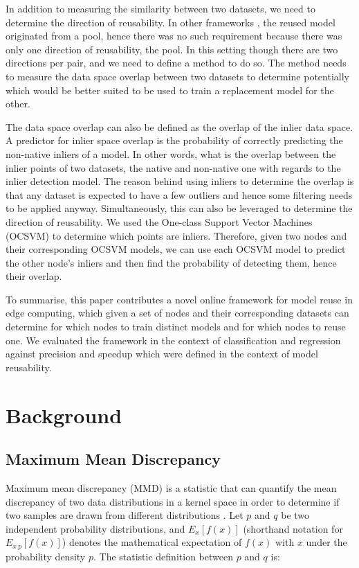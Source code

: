 \documentclass{mpaper}
\begin{document}
In addition to measuring the similarity between two datasets, we need to determine the direction of reusability. In other frameworks \cite{MaterializationReuse, KernelMMD}, the reused model originated from a pool, hence there was no such requirement because there was only one direction of reusability, the pool. In this setting though there are two directions per pair, and we need to define a method to do so. The method needs to measure the data space overlap between two datasets to determine potentially which would be better suited to be used to train a replacement model for the other. 

The data space overlap can also be defined as the overlap of the inlier data space. A predictor for inlier space overlap is the probability of correctly predicting the non-native inliers of a model. In other words, what is the overlap between the inlier points of two datasets, the native and non-native one with regards to the inlier detection model. The reason behind using inliers to determine the overlap is that any dataset is expected to have a few outliers and hence some filtering needs to be applied anyway. Simultaneously, this can also be leveraged to determine the direction of reusability. We used the One-class Support Vector Machines (OCSVM) \cite{OriginalOCSVM} to determine which points are inliers. Therefore, given two nodes and their corresponding OCSVM models, we can use each OCSVM model to predict the other node's inliers and then find the probability of detecting them, hence their overlap. 

To summarise, this paper contributes a novel online framework for model reuse in edge computing, which given a set of nodes and their corresponding datasets can determine for which nodes to train distinct models and for which nodes to reuse one. We evaluated the framework in the context of classification and regression against precision and speedup which were defined in the context of model reusability.

\section{Background}

\subsection{Maximum Mean Discrepancy}\label{chap2:MMD}

Maximum mean discrepancy (MMD) is a statistic that can quantify the mean discrepancy of two data distributions in a kernel space in order to determine if two samples are drawn from different distributions \cite{OriginalMMD}. Let $p$ and $q$ be two independent probability distributions, and $E_x\left[f\left(x\right)\right]$ (shorthand notation for $E_{x~p}\left[f\left(x\right)\right]$) denotes the mathematical expectation of $f\left(x\right)$ with $x$ under the probability density $p$. The statistic definition between $p$ and $q$ is:
\end{document}
